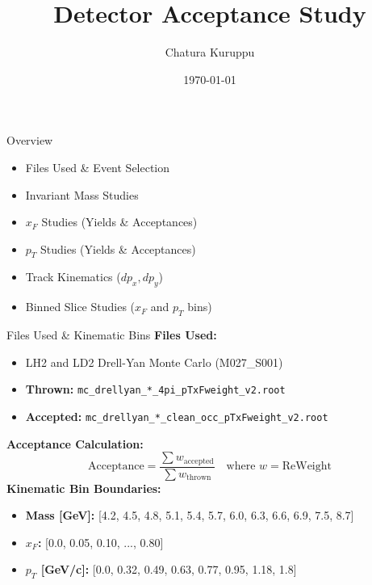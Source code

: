 \documentclass[aspectratio=169]{beamer}
\title{Detector Acceptance Study}
\author{Chatura Kuruppu}
\date{\today}
\begin{document}
\begin{frame}
    \titlepage
\end{frame}

\begin{frame}{Overview}
    \begin{itemize}
        \item Files Used \& Event Selection
        \item Invariant Mass Studies
        \item $x_F$ Studies (Yields \& Acceptances)
        \item $p_T$ Studies (Yields \& Acceptances)
        \item Track Kinematics ($dp_x, dp_y$)
        \item Binned Slice Studies ($x_F$ and $p_T$ bins)
    \end{itemize}
\end{frame}

\begin{frame}{Files Used \& Kinematic Bins}
    \textbf{Files Used:}
    \begin{itemize}
        \item LH2 and LD2 Drell-Yan Monte Carlo (M027\_S001)
        \item \textbf{Thrown:} \texttt{mc\_drellyan\_*\_4pi\_pTxFweight\_v2.root}
        \item \textbf{Accepted:} \texttt{mc\_drellyan\_*\_clean\_occ\_pTxFweight\_v2.root}
    \end{itemize}
    \vspace{0.2cm}
    \textbf{Acceptance Calculation:}
    \begin{equation*}
        \text{Acceptance} = \frac{\sum w_{\text{accepted}}}{\sum w_{\text{thrown}}} \quad \text{where } w = \text{ReWeight}
    \end{equation*}
    \vspace{0.1cm}
    \textbf{Kinematic Bin Boundaries:}
    \begin{itemize}
        \item \textbf{Mass [GeV]:} [4.2, 4.5, 4.8, 5.1, 5.4, 5.7, 6.0, 6.3, 6.6, 6.9, 7.5, 8.7]
        \item \textbf{$x_F$:} [0.0, 0.05, 0.10, ..., 0.80]
        \item \textbf{$p_T$ [GeV/c]:} [0.0, 0.32, 0.49, 0.63, 0.77, 0.95, 1.18, 1.8]
    \end{itemize}
\end{frame}
\end{document}
